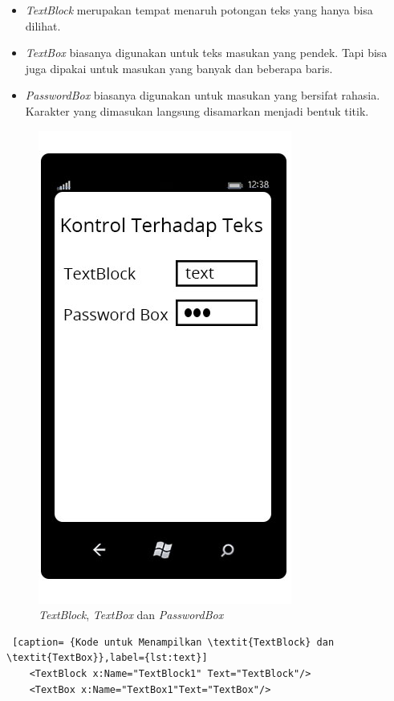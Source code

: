\begin{itemize}
	\item \textit{TextBlock} merupakan tempat menaruh potongan teks yang hanya bisa dilihat.
	\item \textit{TextBox} biasanya digunakan untuk teks masukan yang pendek. Tapi bisa juga dipakai untuk masukan yang banyak dan beberapa baris.
	\item \textit{PasswordBox} biasanya digunakan untuk masukan yang bersifat rahasia. Karakter yang dimasukan langsung disamarkan menjadi bentuk titik.
\end{itemize}

\begin{figure}[h]
	\centering
		\includegraphics[scale=0.5]{Gambar/Tombol/kontrol_teks}
	\caption{\textit{TextBlock}, \textit{TextBox} dan \textit{PasswordBox}}
	\label{fig:kontrol_teks}
\end{figure}

\begin{lstlisting} [caption= {Kode untuk Menampilkan \textit{TextBlock} dan \textit{TextBox}},label={lst:text}]
	<TextBlock x:Name="TextBlock1" Text="TextBlock"/>
	<TextBox x:Name="TextBox1"Text="TextBox"/>
\end{lstlisting}

